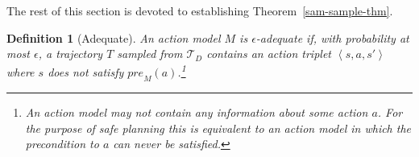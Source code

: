 \documentclass{article}
\newtheorem{definition}{Definition}
\newcommand{\tuple}[1]{\ensuremath{\left \langle #1 \right \rangle }}
\newcommand{\pre}{\textit{pre}}
\begin{document}
The rest of this section is devoted to establishing Theorem~\ref{sam-sample-thm}. 


\begin{definition}[Adequate]
An action model $M$ is {\em $\epsilon$-adequate} if, with probability at most $\epsilon$, a trajectory $T$ sampled from $\mathcal{T}_D$ contains an action triplet $\tuple{s,a,s'}$ where 
$s$ does not satisfy $\pre_M(a)$.\footnote{An action model may not contain any information about some action $a$. 
For the purpose of safe planning this is equivalent to an action model in which the precondition to $a$ can never be satisfied.}
\end{definition}
\end{document}
